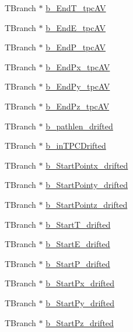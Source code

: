 \begin{DoxyCompactItemize}
\item 
T\-Branch $\ast$ \hyperlink{classanatree_aa9cbc2eb1c9c390f5f59b76c20ff57df}{b\-\_\-\-End\-T\-\_\-tpc\-A\-V}
\item 
T\-Branch $\ast$ \hyperlink{classanatree_aaabafd243f67ea6c3c38d1ce42140b98}{b\-\_\-\-End\-E\-\_\-tpc\-A\-V}
\item 
T\-Branch $\ast$ \hyperlink{classanatree_a7fc68907c81bf041b369a7fb74760d82}{b\-\_\-\-End\-P\-\_\-tpc\-A\-V}
\item 
T\-Branch $\ast$ \hyperlink{classanatree_ade7c06619154a623b5c00885361c879e}{b\-\_\-\-End\-Px\-\_\-tpc\-A\-V}
\item 
T\-Branch $\ast$ \hyperlink{classanatree_aa8d1182a6197f559eb1fb95579b03c98}{b\-\_\-\-End\-Py\-\_\-tpc\-A\-V}
\item 
T\-Branch $\ast$ \hyperlink{classanatree_a4d2f3d8f17a29f09e97573ef718ca792}{b\-\_\-\-End\-Pz\-\_\-tpc\-A\-V}
\item 
T\-Branch $\ast$ \hyperlink{classanatree_a72b1921b93bb0d96afb74018ab2dc285}{b\-\_\-pathlen\-\_\-drifted}
\item 
T\-Branch $\ast$ \hyperlink{classanatree_a12a7a9ee541344d1f07cc96eae7af63a}{b\-\_\-in\-T\-P\-C\-Drifted}
\item 
T\-Branch $\ast$ \hyperlink{classanatree_aac01ca332b7a048d93d905c56422fc2a}{b\-\_\-\-Start\-Pointx\-\_\-drifted}
\item 
T\-Branch $\ast$ \hyperlink{classanatree_a7fa962a9deea8be0924a7a917ec312e3}{b\-\_\-\-Start\-Pointy\-\_\-drifted}
\item 
T\-Branch $\ast$ \hyperlink{classanatree_a682ef0689db26bad01179fcc1ccf3651}{b\-\_\-\-Start\-Pointz\-\_\-drifted}
\item 
T\-Branch $\ast$ \hyperlink{classanatree_a3a88ec3c4d33b3776456f84b47f9743e}{b\-\_\-\-Start\-T\-\_\-drifted}
\item 
T\-Branch $\ast$ \hyperlink{classanatree_ab891a28553d7e4ab7a165b01297d7aa1}{b\-\_\-\-Start\-E\-\_\-drifted}
\item 
T\-Branch $\ast$ \hyperlink{classanatree_a04fdecba4c95c6c84f4986a7541c9ccd}{b\-\_\-\-Start\-P\-\_\-drifted}
\item 
T\-Branch $\ast$ \hyperlink{classanatree_a1fb8c7f6311e701256acde6c6896ea2f}{b\-\_\-\-Start\-Px\-\_\-drifted}
\item 
T\-Branch $\ast$ \hyperlink{classanatree_a1dca49cc8749dda0eaf01eb0fd860afc}{b\-\_\-\-Start\-Py\-\_\-drifted}
\item 
T\-Branch $\ast$ \hyperlink{classanatree_aecbf099b8a893fa767397d12cd202ec7}{b\-\_\-\-Start\-Pz\-\_\-drifted}

\end{DoxyCompactItemize}
